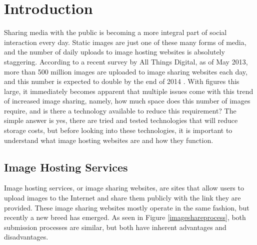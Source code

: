 %
%

\chapter{Introduction}\label{ch:intro} %


Sharing media with the public is becoming a more integral part of social interaction every day. Static images are just one of these many forms of media, and the number of daily uploads to image hosting websites is absolutely staggering. According to a recent survey by All Things Digital, as of May 2013, more than 500 million images are uploaded to image sharing websites each day, and this number is expected to double by the end of 2014 \cite{meek:500}. With figures this large, it immediately becomes apparent that multiple issues come with this trend of increased image sharing, namely, how much space does this number of images require, and is there a technology available to reduce this requirement? The simple answer is yes, there are tried and tested technologies that will reduce storage costs, but before looking into these technologies, it is important to understand what image hosting websites are and how they function.

\section{Image Hosting Services} \label{sec:imagehostingservices}
Image hosting services, or image sharing websites, are sites that allow users to upload images to the Internet and share them publicly with the link they are provided. These image sharing websites mostly operate in the same fashion, but recently a new breed has emerged. As seen in Figure \ref{imageshareprocess}, both submission processes are similar, but both have inherent advantages and disadvantages.

